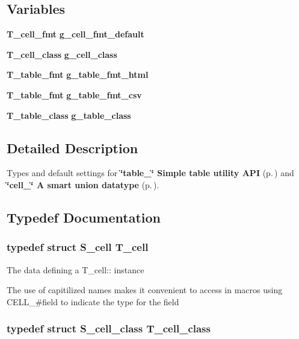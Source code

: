 \subsection*{Variables}
\begin{CompactItemize}
\item 
{\bf T\_\-cell\_\-fmt} {\bf g\_\-cell\_\-fmt\_\-default}
\item 
{\bf T\_\-cell\_\-class} {\bf g\_\-cell\_\-class}
\item 
{\bf T\_\-table\_\-fmt} {\bf g\_\-table\_\-fmt\_\-html}
\item 
{\bf T\_\-table\_\-fmt} {\bf g\_\-table\_\-fmt\_\-csv}
\item 
{\bf T\_\-table\_\-class} {\bf g\_\-table\_\-class}
\end{CompactItemize}


\subsection{Detailed Description}
Types and default settings for {\bf \char`\"{}table\_\-\char`\"{} Simple table utility API} {\rm (p.\,\pageref{group__simple__table})} and {\bf \char`\"{}cell\_\-\char`\"{} A smart union datatype} {\rm (p.\,\pageref{group__table__cell})}.





\subsection{Typedef Documentation}
\subsubsection{\setlength{\rightskip}{0pt plus 5cm}typedef struct {\bf S\_\-cell}  T\_\-cell}\label{table_8h_a4}


The data defining a T\_\-cell:: instance

The use of capitilized names makes it convenient to access in macros using CELL\_\-\#field to indicate the type for the field 
\subsubsection{\setlength{\rightskip}{0pt plus 5cm}typedef struct {\bf S\_\-cell\_\-class}  T\_\-cell\_\-class}\label{table_8h_a2}


